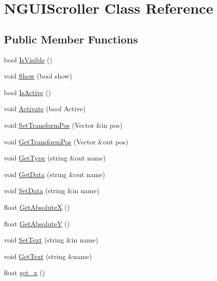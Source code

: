 \hypertarget{class_n_g_u_i_scroller}{}\section{N\+G\+U\+I\+Scroller Class Reference}
\label{class_n_g_u_i_scroller}
\subsection*{Public Member Functions}
\begin{DoxyCompactItemize}
\item 
bool \hyperlink{class_n_g_u_i_scroller_adb2d7f37d2ebfe5dfffdd82aceeb9d8c}{Is\+Visible} ()
\item 
void \hyperlink{class_n_g_u_i_scroller_a49a2391abc2f43a8b0a93b88d304747e}{Show} (bool show)
\item 
bool \hyperlink{class_n_g_u_i_scroller_a450497bff5bc79875a166a3b82e828de}{Is\+Active} ()
\item 
void \hyperlink{class_n_g_u_i_scroller_a2b8d34f2f68d7d0f85098fd85a83d444}{Activate} (bool Active)
\item 
void \hyperlink{class_n_g_u_i_scroller_a041cefceab0625ea53b86ed5715621a4}{Set\+Transform\+Pos} (Vector \&in pos)
\item 
void \hyperlink{class_n_g_u_i_scroller_a72eb74327e18d24c40b751dd6938ab71}{Get\+Transform\+Pos} (Vector \&out pos)
\item 
void \hyperlink{class_n_g_u_i_scroller_ad32b6ae5db2a522e19d087e8394c5b9f}{Get\+Type} (string \&out name)
\item 
void \hyperlink{class_n_g_u_i_scroller_a90933bab31a1cc2701b7f236ebb0c026}{Get\+Data} (string \&out name)
\item 
void \hyperlink{class_n_g_u_i_scroller_afdcf1faf70bdb6dc2b18543232e8385b}{Set\+Data} (string \&in name)
\item 
float \hyperlink{class_n_g_u_i_scroller_aee68fffe9c4ce421cccdbb077122f5ce}{Get\+AbsoluteX} ()
\item 
float \hyperlink{class_n_g_u_i_scroller_aa52e0b0151609edb4373738e14a8b472}{Get\+AbsoluteY} ()
\item 
void \hyperlink{class_n_g_u_i_scroller_ac92b89d6e4a7362c44e8047b1e22e7c8}{Set\+Text} (string \&in name)
\item 
void \hyperlink{class_n_g_u_i_scroller_aa38ada8b6e3268ad1d5205569ad44504}{Get\+Text} (string \&name)
\item 
float \hyperlink{class_n_g_u_i_scroller_a770d46565143c5f953a8d845d79c5959}{get\+\_\+x} ()

\end{DoxyCompactItemize}
